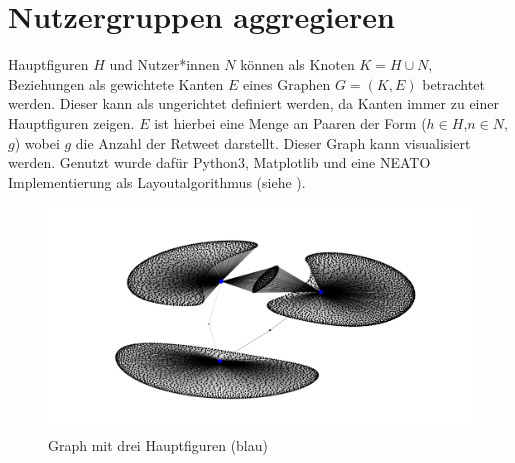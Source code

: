 \section{Nutzergruppen aggregieren}
 Hauptfiguren $H$ und Nutzer*innen $N$ können als Knoten $K = H \cup N$,  Beziehungen als gewichtete Kanten $E$ eines Graphen $G = (K,E)$ betrachtet werden.
Dieser kann als ungerichtet definiert werden, da Kanten immer zu einer Hauptfiguren zeigen.
$E$ ist hierbei eine Menge an Paaren der Form ($h\in H$,$n\in  N$,$g$) wobei $g$ die Anzahl der \gls{Retweet} darstellt. 
Dieser Graph kann visualisiert werden. Genutzt wurde dafür \gls{Python3}, \gls{Matplotlib} und eine NEATO Implementierung als \gls{Layoutalgorithmus} (siehe ).
\begin{figure}[h]
	\centering
	\includegraphics[width=\linewidth]{images/GraphNoAggregation}
	\caption[]{Graph mit drei Hauptfiguren (blau)}
	\label{fig:graphnoaggregation}
\end{figure}

